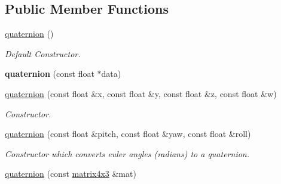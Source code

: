 \subsection*{Public Member Functions}
\begin{DoxyCompactItemize}
\item 
\hyperlink{classirr_1_1core_1_1quaternion_af19629224bc2ed3a3ecbc335309099c8}{quaternion} ()\hypertarget{classirr_1_1core_1_1quaternion_af19629224bc2ed3a3ecbc335309099c8}{}\label{classirr_1_1core_1_1quaternion_af19629224bc2ed3a3ecbc335309099c8}

\begin{DoxyCompactList}\small\item\em Default Constructor. \end{DoxyCompactList}\item 
{\bfseries quaternion} (const float $\ast$data)\hypertarget{classirr_1_1core_1_1quaternion_a90e3b74391d16acfcd0c8e658741f0af}{}\label{classirr_1_1core_1_1quaternion_a90e3b74391d16acfcd0c8e658741f0af}

\item 
\hyperlink{classirr_1_1core_1_1quaternion_a0dd7ef378726b328f8efc370f39abf0d}{quaternion} (const float \&x, const float \&y, const float \&z, const float \&w)\hypertarget{classirr_1_1core_1_1quaternion_a0dd7ef378726b328f8efc370f39abf0d}{}\label{classirr_1_1core_1_1quaternion_a0dd7ef378726b328f8efc370f39abf0d}

\begin{DoxyCompactList}\small\item\em Constructor. \end{DoxyCompactList}\item 
\hyperlink{classirr_1_1core_1_1quaternion_ad9691a9d5755e15fea659dd8dbf8c5ae}{quaternion} (const float \&pitch, const float \&yaw, const float \&roll)\hypertarget{classirr_1_1core_1_1quaternion_ad9691a9d5755e15fea659dd8dbf8c5ae}{}\label{classirr_1_1core_1_1quaternion_ad9691a9d5755e15fea659dd8dbf8c5ae}

\begin{DoxyCompactList}\small\item\em Constructor which converts euler angles (radians) to a quaternion. \end{DoxyCompactList}\item 
\hyperlink{classirr_1_1core_1_1quaternion_a5c8e9be05579e24c071d8b4e437760c1}{quaternion} (const \hyperlink{classirr_1_1core_1_1matrix4x3}{matrix4x3} \&mat)\hypertarget{classirr_1_1core_1_1quaternion_a5c8e9be05579e24c071d8b4e437760c1}{}\label{classirr_1_1core_1_1quaternion_a5c8e9be05579e24c071d8b4e437760c1}


\end{DoxyCompactItemize}
